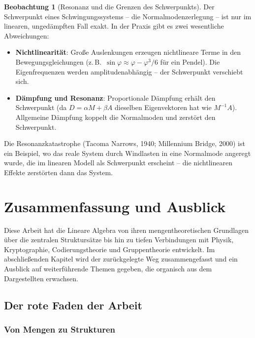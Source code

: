 ﻿\documentclass[a4paper,12pt]{report}
\theoremstyle{definition}
\newtheorem{beobachtung}{Beobachtung}
\begin{document}
\begin{beobachtung}[Resonanz und die Grenzen des Schwerpunkts]
    Der Schwerpunkt eines Schwingungssystems -- die Normalmodenzerlegung --
    ist nur im linearen, ungedämpften Fall exakt. In der Praxis gibt es
    zwei wesentliche Abweichungen:
    \begin{itemize}
        \item[-] \textbf{Nichtlinearität}: Große Auslenkungen erzeugen
              nichtlineare Terme in den Bewegungsgleichungen
              (z.\,B.\ $\sin\varphi \approx \varphi - \varphi^3/6$
              für ein Pendel). Die Eigenfrequenzen werden
              amplitudenabhängig -- der Schwerpunkt verschiebt sich.
        \item[-] \textbf{Dämpfung und Resonanz}: Proportionale Dämpfung
              erhält den Schwerpunkt (da $D = \alpha M + \beta A$
              dieselben Eigenvektoren hat wie $M^{-1}A$). Allgemeine
              Dämpfung koppelt die Normalmoden und zerstört den Schwerpunkt.
    \end{itemize}
    Die Resonanzkatastrophe (Tacoma Narrows, 1940; Millennium Bridge, 2000)
    ist ein Beispiel, wo das reale System durch Windlasten in eine
    Normalmode angeregt wurde, die im linearen Modell als Schwerpunkt
    erscheint -- die nichtlinearen Effekte zerstörten dann das System.
\end{beobachtung}

\chapter{Zusammenfassung und Ausblick}

Diese Arbeit hat die Lineare Algebra von ihren mengentheoretischen
Grundlagen über die zentralen Struktursätze bis hin zu tiefen
Verbindungen mit Physik, Kryptographie, Codierungstheorie und
Gruppentheorie entwickelt. Im abschließenden Kapitel wird der
zurückgelegte Weg zusammengefasst und ein Ausblick auf weiterführende
Themen gegeben, die organisch aus dem Dargestellten erwachsen.

\section{Der rote Faden der Arbeit}

\subsection*{Von Mengen zu Strukturen}
\end{document}
